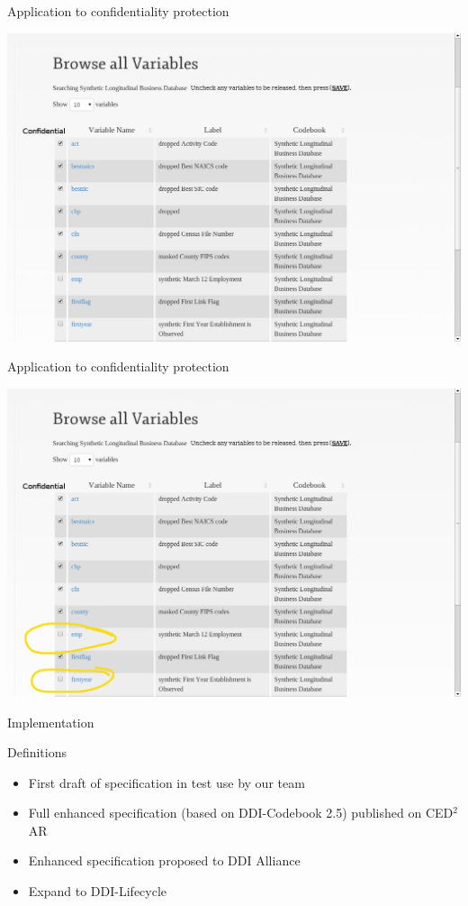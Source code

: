 \begin{frame}{Application to confidentiality protection}
\begin{center}
\includegraphics[width=1\linewidth]{Screenshot_2013-11-04_13:18:11_mock}
\end{center}
\end{frame}

\begin{frame}{Application to confidentiality protection}
\begin{center}
\includegraphics[width=1\linewidth]{Screenshot_2013-11-04_13:18:11_mock2}
\end{center}
\end{frame}

\begin{frame}{Implementation}
\begin{block}{Definitions}
\begin{itemize}[<+->]
\item First draft of specification in test use by our team
\item Full enhanced specification (based on DDI-Codebook 2.5) published on CED$^2$AR
\item Enhanced specification proposed to DDI Alliance
\item Expand to DDI-Lifecycle
\end{itemize}
\end{block}
\end{frame}

